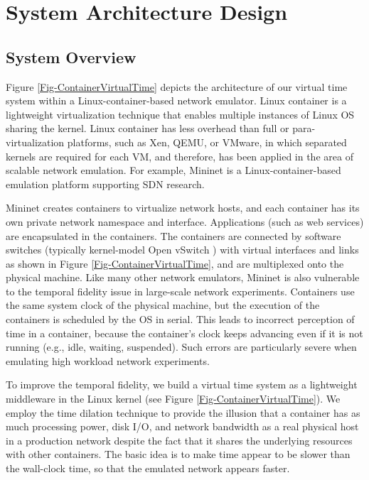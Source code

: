 \section{System Architecture Design}
\label{Sec-Architecture}

\subsection{System Overview}
Figure \ref{Fig-ContainerVirtualTime} depicts the architecture of our virtual time system within a Linux-container-based network emulator. 
Linux container \cite{LXC} is a lightweight virtualization technique that enables multiple instances of Linux OS sharing the kernel. 
Linux container has less overhead than full or para-virtualization platforms, such as Xen, QEMU, or VMware, in which separated kernels are required for each VM, and therefore, has been applied in the area of scalable network emulation. For example, Mininet \cite{Mininet} is a Linux-container-based emulation platform supporting SDN research. 

Mininet creates containers to virtualize network hosts, and each container has its own private network namespace and interface. 
Applications (such as web services) are encapsulated in the containers. The containers are connected by software switches (typically kernel-model Open vSwitch \cite{OpenvSwitch}) with virtual interfaces and links as shown in Figure \ref{Fig-ContainerVirtualTime}, and are multiplexed onto the physical machine. 
Like many other network emulators, Mininet is also vulnerable to the temporal fidelity issue in large-scale network experiments. 
Containers use the same system clock of the physical machine, but the execution of the containers is scheduled by the OS in serial. 
This leads to incorrect perception of time in a container, because the container's clock keeps advancing even if it is not running (e.g., idle, waiting, suspended). 
Such errors are particularly severe when emulating high workload network experiments.

To improve the temporal fidelity, we build a virtual time system as a lightweight middleware in the Linux kernel (see Figure \ref{Fig-ContainerVirtualTime}). 
We employ the time dilation technique to provide the illusion that a container has as much processing power, disk I/O, and network bandwidth as a real physical host in a production network despite the fact that it shares the underlying resources with other containers. 
The basic idea is to make time appear to be slower than the wall-clock time, so that the emulated network appears faster.

